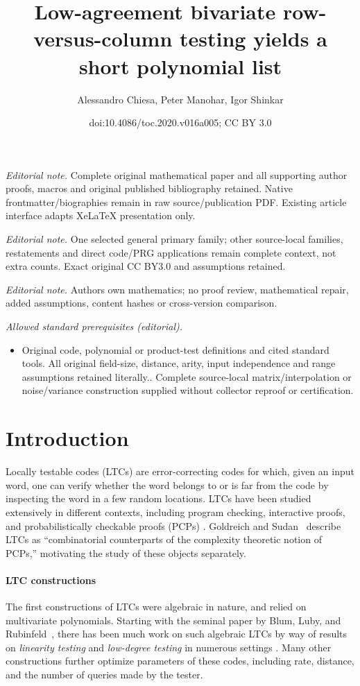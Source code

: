 \documentclass[11pt]{article}
\title{Low-agreement bivariate row-versus-column testing yields a short polynomial list}
\author{Alessandro Chiesa, Peter Manohar, Igor Shinkar}
\date{doi:10.4086/toc.2020.v016a005; CC BY 3.0}
\numberwithin{equation}{section}
\theoremstyle{definition}
\theoremstyle{plain}
\theoremstyle{plain}
\newcommand{\parhead}{\paragraph}
\begin{document}
\maketitle
\noindent\textit{Editorial note.} Complete original mathematical paper and all supporting author proofs, macros and original published bibliography retained. Native frontmatter/biographies remain in raw source/publication PDF. Existing article interface adapts XeLaTeX presentation only.\par\medskip
\noindent\textit{Editorial note.} One selected general primary family; other source-local families, restatements and direct code/PRG applications remain complete context, not extra counts. Exact original CC BY3.0 and assumptions retained.\par\medskip
\noindent\textit{Editorial note.} Authors own mathematics; no proof review, mathematical repair, added assumptions, content hashes or cross-version comparison.\par\medskip
\noindent\textit{Allowed standard prerequisites (editorial).}\begin{itemize}
\item Original code, polynomial or product-test definitions and cited standard tools. All original field-size, distance, arity, input independence and range assumptions retained literally.. Complete source-local matrix/interpolation or noise/variance construction supplied without collector reproof or certification.
\end{itemize}\medskip
\section{Introduction}\label{sec:intro}
%


Locally testable codes (LTCs) are error-correcting codes for which, given an input word, one can verify whether the word belongs to or is far from the code by inspecting the word in a few random locations.
LTCs have been studied extensively in different contexts, including program checking, interactive proofs, and probabilistically checkable proofs (PCPs) \cite{BlumLR93,RubinfeldS96,BabaiFL91,BabaiFLS91,PolishchukS94, GoldreichS06}. Goldreich and Sudan~\cite{GoldreichS06} describe LTCs as ``combinatorial counterparts of the complexity theoretic notion of PCPs,'' motivating the study of these objects separately.

\parhead{LTC constructions}
The first constructions of LTCs were algebraic in nature, and relied on multivariate polynomials. Starting with the seminal
%
paper by  %
Blum, Luby, and Rubinfeld~\cite{BlumLR93}, there has been much work on such algebraic LTCs by way of results on \emph{linearity testing} and \emph{low-degree testing} in numerous settings \cite{BlumLR93,BenOrCLR08,BenSassonSVW03,BellareCHKS96,AlonKKLR05,BhattacharyyaKSSZ10}. Many other constructions \cite{Meir09, Viderman13, KoppartyMRS16} further optimize parameters of these codes,
including rate, distance, and the number of queries made by the tester.
\end{document}
